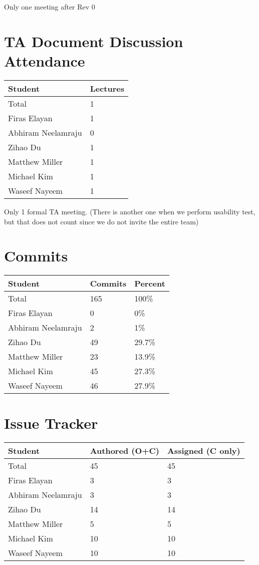 \documentclass{article}
\begin{document}
Only one meeting after Rev 0

\section{TA Document Discussion Attendance}

\begin{table}[H]
\centering
\begin{tabular}{ll}
\toprule
\textbf{Student} & \textbf{Lectures}\\
\midrule
Total & 1\\
Firas Elayan & 1\\
Abhiram Neelamraju & 0\\
 Zihao Du & 1\\
 Matthew Miller & 1\\
 Michael Kim & 1\\
 Waseef Nayeem & 1\\
\bottomrule
\end{tabular}
\end{table}

Only 1 formal TA meeting. (There is another one when we perform usability test, but that does not count since we do not invite the entire team)

\section{Commits}
\begin{table}[H]
\centering
\begin{tabular}{lll}
\toprule
\textbf{Student} & \textbf{Commits} & \textbf{Percent}\\
\midrule
Total & 165 & 100\% \\
Firas Elayan & 0 & 0\% \\
Abhiram Neelamraju & 2 & 1\%\\
 Zihao Du & 49 & 29.7\%\\
 Matthew Miller & 23 & 13.9\%\\
 Michael Kim & 45 & 27.3\%\\
 Waseef Nayeem & 46 & 27.9\%\\
\bottomrule
\end{tabular}
\end{table}

\section{Issue Tracker}
\begin{table}[H]
\centering
\begin{tabular}{lll}
\toprule
\textbf{Student} & \textbf{Authored (O+C)} & \textbf{Assigned (C only)}\\
\midrule
Total & 45 & 45 \\
Firas Elayan & 3 & 3\\
Abhiram Neelamraju & 3 & 3\\
 Zihao Du & 14 & 14\\
 Matthew Miller & 5 & 5\\
 Michael Kim & 10 & 10\\
 Waseef Nayeem & 10 & 10\\
\bottomrule
\end{tabular}
\end{table}
\end{document}
